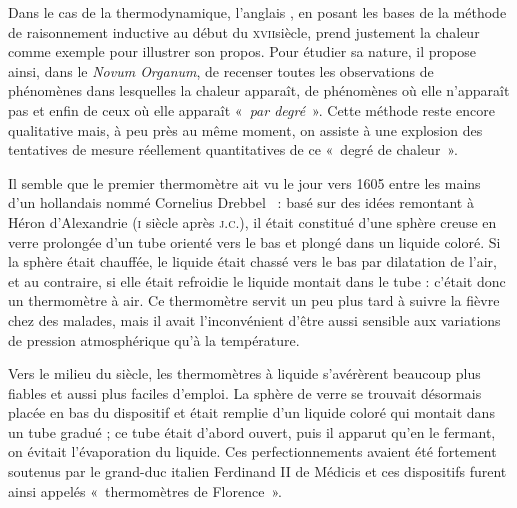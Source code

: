 	Dans le cas de la thermodynamique, l’anglais , en posant les bases de la méthode de raisonnement inductive au début du \textsc{xvii}\ieme siècle, prend justement la chaleur comme exemple pour illustrer son propos. Pour étudier sa nature, il propose ainsi, dans le \textit{Novum Organum}, de recenser toutes les observations de phénomènes dans lesquelles la chaleur apparaît, de phénomènes où elle n'apparaît pas et enfin de ceux où elle apparaît «~\emph{par degré}~». Cette méthode reste encore qualitative mais, à peu près au même moment, on assiste à une explosion des tentatives de mesure réellement quantitatives de ce «~degré de chaleur~».
	
	Il semble que le premier thermomètre ait vu le jour vers 1605 entre les mains d'un hollandais nommé Cornelius Drebbel~\cite{locqueneux1996} : basé sur des idées remontant à Héron d'Alexandrie (\textsc{i}\xspace siècle après \textsc{j.c.}), il était constitué d'une sphère creuse en verre prolongée d'un tube orienté vers le bas et plongé dans un liquide coloré. Si la sphère était chauffée, le liquide était chassé vers le bas par dilatation de l'air, et au contraire, si elle était refroidie le liquide montait dans le tube : c'était donc un thermomètre à air. Ce thermomètre servit un peu plus tard à suivre la fièvre chez des malades, mais il avait l'inconvénient d'être aussi sensible aux variations de pression atmosphérique qu'à la température. 
	
	Vers le milieu du siècle, les thermomètres à liquide s'avérèrent beaucoup plus fiables et aussi plus faciles d'emploi. La sphère de verre se trouvait désormais placée en bas du dispositif et était remplie d'un liquide coloré qui montait dans un tube gradué ; ce tube était d'abord ouvert, puis il apparut qu'en le fermant, on évitait l'évaporation du liquide. Ces perfectionnements avaient été fortement soutenus par le grand-duc italien Ferdinand II de Médicis et ces dispositifs furent ainsi appelés «~thermomètres de Florence~».
	
